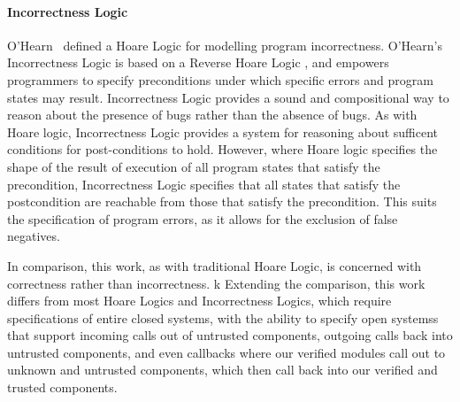 \paragraph{Incorrectness Logic}

O'Hearn~\cite{IncorrectnessLogic} defined a Hoare Logic for modelling
program incorrectness. O'Hearn's Incorrectness Logic is based on a
Reverse Hoare Logic \cite{reverseHoare}, and empowers programmers to
specify preconditions under which specific errors and program states
may result.  Incorrectness Logic provides a sound and compositional
way to reason about the presence of bugs rather than the absence of
bugs.  As with Hoare logic, Incorrectness Logic provides a system for
reasoning about sufficent conditions for post-conditions to hold.
However, where Hoare logic specifies the shape of the result of
execution of all program states that satisfy the precondition,
Incorrectness Logic specifies that all states that satisfy the
postcondition are reachable from those that satisfy the
precondition. This suits the specification of program errors, as it
allows for the exclusion of false negatives.




In comparison, this work, as with traditional Hoare Logic, is
concerned with correctness rather than incorrectness.
k%
Extending the comparison,
this work 
differs from most Hoare Logics and Incorrectness Logics,
which require specifications of entire closed systems,
with the ability to specify open systemss that support incoming calls
out of untrusted components, outgoing calls back into untrusted
components, and even callbacks where
our verified modules call out to unknown and untrusted components,
which then call back into our verified and trusted components.


%



